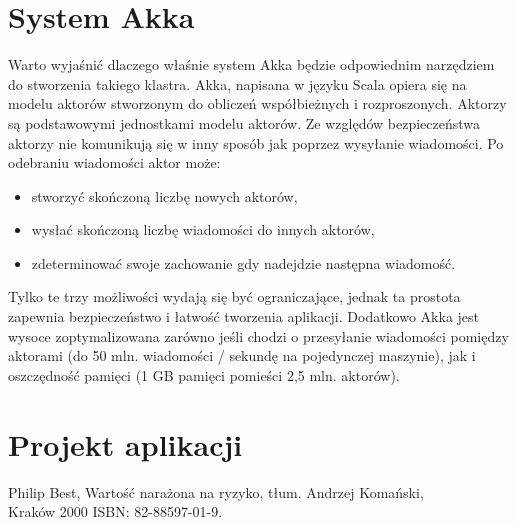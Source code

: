 \documentclass[11pt,titlepage]{article}
\numberwithin{equation}{section}
\begin{document}
\section{System Akka}
Warto wyjaśnić dlaczego właśnie system Akka będzie odpowiednim narzędziem do stworzenia takiego klastra. Akka, napisana w języku Scala opiera się na modelu aktorów stworzonym do obliczeń współbieżnych i rozproszonych. Aktorzy są podstawowymi jednostkami modelu aktorów. Ze względów bezpieczeństwa aktorzy nie komunikują się w inny sposób jak poprzez wysyłanie wiadomości. Po odebraniu wiadomości aktor może:

\begin{itemize}
  \item stworzyć skończoną liczbę nowych aktorów,
	\item wysłać skończoną liczbę wiadomości do innych aktorów,
	\item zdeterminować swoje zachowanie gdy nadejdzie następna wiadomość.

\end{itemize}
Tylko te trzy możliwości wydają się być ograniczające, jednak ta prostota zapewnia bezpieczeństwo i łatwość tworzenia aplikacji. 
Dodatkowo Akka jest wysoce zoptymalizowana zarówno jeśli chodzi o przesyłanie wiadomości pomiędzy aktorami (do 50 mln. wiadomości / sekundę na pojedynczej maszynie), jak i oszczędność pamięci (1 GB pamięci pomieści 2,5 mln. aktorów). 


\newpage
\section{Projekt aplikacji}




\newpage



Philip Best, Wartość narażona na ryzyko, tłum. Andrzej Komański,
\\
Kraków 2000 ISBN: 82-88597-01-9.
\end{document}
